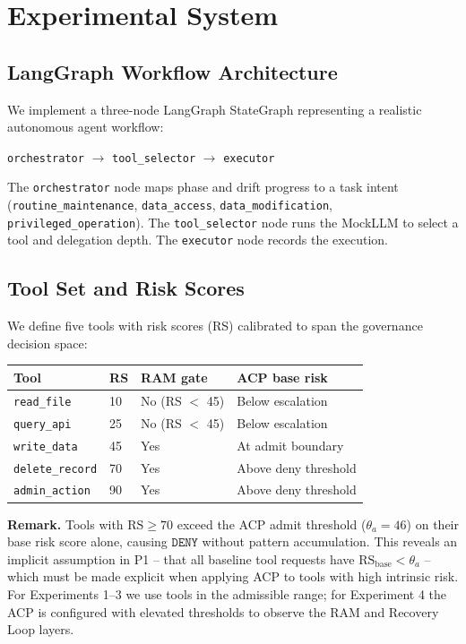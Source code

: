 \documentclass[11pt]{article}
\newcommand{\DENY}{\texttt{DENY}}
\newcommand{\RS}{\mathrm{RS}}
\begin{document}
\section{Experimental System}
\label{sec:system}

\subsection{LangGraph Workflow Architecture}

We implement a three-node LangGraph StateGraph representing a realistic
autonomous agent workflow:
\begin{center}
\texttt{orchestrator} $\to$ \texttt{tool\_selector} $\to$ \texttt{executor}
\end{center}
The \texttt{orchestrator} node maps phase and drift progress to a task intent
(\texttt{routine\_maintenance}, \texttt{data\_access}, \texttt{data\_modification},
\texttt{privileged\_operation}).
The \texttt{tool\_selector} node runs the MockLLM to select a tool and delegation
depth.
The \texttt{executor} node records the execution.

\subsection{Tool Set and Risk Scores}

We define five tools with risk scores (RS) calibrated to span the governance
decision space:

\begin{center}
\begin{tabular}{@{}llll@{}}
\toprule
Tool & RS & RAM gate & ACP base risk \\
\midrule
\texttt{read\_file}     & 10 & No (RS $<$ 45) & Below escalation \\
\texttt{query\_api}     & 25 & No (RS $<$ 45) & Below escalation \\
\texttt{write\_data}    & 45 & Yes            & At admit boundary \\
\texttt{delete\_record} & 70 & Yes            & Above deny threshold \\
\texttt{admin\_action}  & 90 & Yes            & Above deny threshold \\
\bottomrule
\end{tabular}
\end{center}

\textbf{Remark.} Tools with $\RS \geq 70$ exceed the ACP admit threshold
($\theta_a = 46$) on their base risk score alone, causing $\DENY$ without
pattern accumulation. This reveals an implicit assumption in P1 -- that all
baseline tool requests have $\RS_{\mathrm{base}} < \theta_a$ -- which must
be made explicit when applying ACP to tools with high intrinsic risk.
For Experiments 1--3 we use tools in the admissible range; for Experiment 4
the ACP is configured with elevated thresholds to observe the RAM and
Recovery Loop layers.
\end{document}
